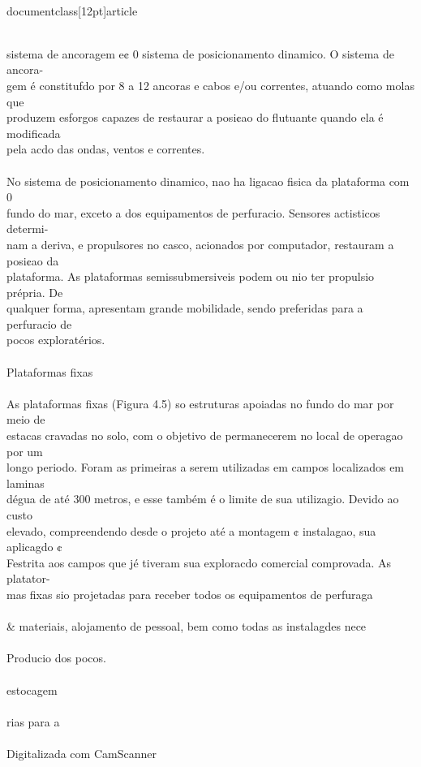 \\documentclass[12pt]{article}
\begin{document}
\\
sistema de ancoragem e¢ 0 sistema de posicionamento dinamico. O sistema de ancora-\\
gem é constitufdo por 8 a 12 ancoras e cabos e/ou correntes, atuando como molas que\\
produzem esforgos capazes de restaurar a posi¢ao do flutuante quando ela é modificada\\
pela acdo das ondas, ventos e correntes.\\
\\
No sistema de posicionamento dinamico, nao ha ligacao fisica da plataforma com 0\\
fundo do mar, exceto a dos equipamentos de perfuracio. Sensores actisticos determi-\\
nam a deriva, e propulsores no casco, acionados por computador, restauram a posi¢ao da\\
plataforma. As plataformas semissubmersiveis podem ou nio ter propulsio prépria. De\\
qualquer forma, apresentam grande mobilidade, sendo preferidas para a perfuracio de\\
pocos exploratérios.\\
\\
Plataformas fixas\\
\\
As plataformas fixas (Figura 4.5) so estruturas apoiadas no fundo do mar por meio de\\
estacas cravadas no solo, com o objetivo de permanecerem no local de operagao por um\\
longo periodo. Foram as primeiras a serem utilizadas em campos localizados em laminas\\
dégua de até 300 metros, e esse também é o limite de sua utilizagio. Devido ao custo\\
elevado, compreendendo desde o projeto até a montagem ¢ instalagao, sua aplicagdo ¢\\
Festrita aos campos que jé tiveram sua exploracdo comercial comprovada. As platator-\\
mas fixas sio projetadas para receber todos os equipamentos de perfuraga\\
\\& materiais, alojamento de pessoal, bem como todas as instalagdes nece\\
\\
Producio dos pocos.\\
\\
estocagem\\
\\
rias para a\\
\\
Digitalizada com CamScanner\\
\end{document}
